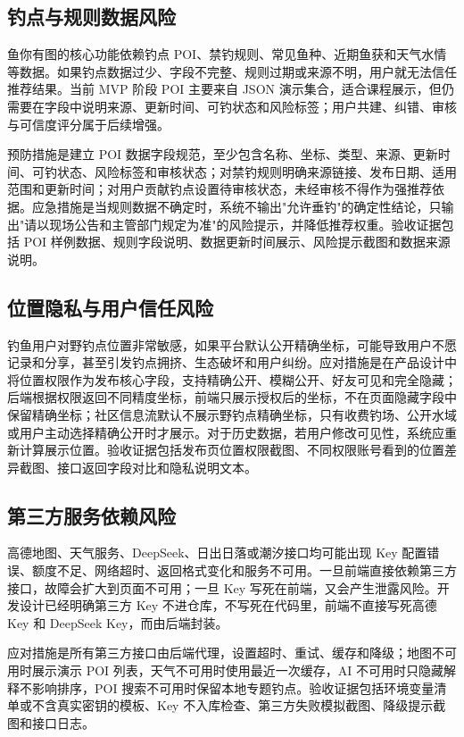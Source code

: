 \subsection{钓点与规则数据风险}

鱼你有图的核心功能依赖钓点 POI、禁钓规则、常见鱼种、近期鱼获和天气水情等数据。如果钓点数据过少、字段不完整、规则过期或来源不明，用户就无法信任推荐结果。当前 MVP 阶段 POI 主要来自 JSON 演示集合，适合课程展示，但仍需要在字段中说明来源、更新时间、可钓状态和风险标签；用户共建、纠错、审核与可信度评分属于后续增强。

预防措施是建立 POI 数据字段规范，至少包含名称、坐标、类型、来源、更新时间、可钓状态、风险标签和审核状态；对禁钓规则明确来源链接、发布日期、适用范围和更新时间；对用户贡献钓点设置待审核状态，未经审核不得作为强推荐依据。应急措施是当规则数据不确定时，系统不输出"允许垂钓"的确定性结论，只输出"请以现场公告和主管部门规定为准"的风险提示，并降低推荐权重。验收证据包括 POI 样例数据、规则字段说明、数据更新时间展示、风险提示截图和数据来源说明。

\subsection{位置隐私与用户信任风险}

钓鱼用户对野钓点位置非常敏感，如果平台默认公开精确坐标，可能导致用户不愿记录和分享，甚至引发钓点拥挤、生态破坏和用户纠纷。应对措施是在产品设计中将位置权限作为发布核心字段，支持精确公开、模糊公开、好友可见和完全隐藏；后端根据权限返回不同精度坐标，前端只展示授权后的坐标，不在页面隐藏字段中保留精确坐标；社区信息流默认不展示野钓点精确坐标，只有收费钓场、公开水域或用户主动选择精确公开时才展示。对于历史数据，若用户修改可见性，系统应重新计算展示位置。验收证据包括发布页位置权限截图、不同权限账号看到的位置差异截图、接口返回字段对比和隐私说明文本。

\subsection{第三方服务依赖风险}

高德地图、天气服务、DeepSeek、日出日落或潮汐接口均可能出现 Key 配置错误、额度不足、网络超时、返回格式变化和服务不可用。一旦前端直接依赖第三方接口，故障会扩大到页面不可用；一旦 Key 写死在前端，又会产生泄露风险。开发设计已经明确第三方 Key 不进仓库，不写死在代码里，前端不直接写死高德 Key 和 DeepSeek Key，而由后端封装。

应对措施是所有第三方接口由后端代理，设置超时、重试、缓存和降级；地图不可用时展示演示 POI 列表，天气不可用时使用最近一次缓存，AI 不可用时只隐藏解释不影响排序，POI 搜索不可用时保留本地专题钓点。验收证据包括环境变量清单或不含真实密钥的模板、Key 不入库检查、第三方失败模拟截图、降级提示截图和接口日志。

